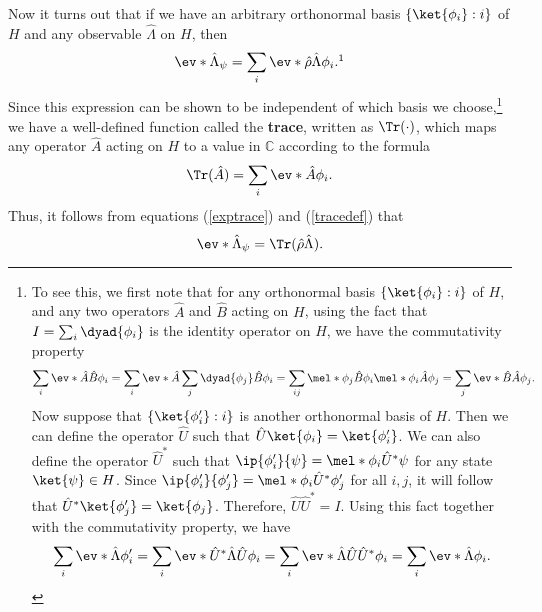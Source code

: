       Now it turns out that if we have an arbitrary orthonormal basis $\{\ket{\phi_i}:i\}$ of $H$ and any observable $\hat{\Lambda}$ on $H$, then 
    \begin{equation}\label{exptrace}\ev*{\hat{\Lambda}}_\psi=\sum_{i}\ev*{\hat{\rho}\hat{\Lambda}}{\phi_i}.\protect\footnotemark
    \end{equation}
    Since this expression can be shown to be independent of
     which basis we choose,\footnote{To see this, we first note that for any orthonormal basis $\{\ket{\phi_i}:i\}$ of $H$, and any two operators $\hat{A}$ and $\hat{B}$ acting on $H$, using the fact that $I=\sum_i\dyad{\phi_i}$ is the identity operator on $H$, we have the commutativity property $$\sum_i\ev*{\hat{A}\hat{B}}{\phi_i}=\sum_i\ev*{\hat{A}\sum_j\dyad{\phi_j}\hat{B}}{\phi_i}=\sum_{ij}\mel*{\phi_j}{\hat{B}}{\phi_i}\mel*{\phi_i}{\hat{A}}{\phi_j}=\sum_j\ev*{\hat{B}\hat{A}}{\phi_j}.$$ Now suppose that $\{\ket{\phi_i'}:i\}$  is another orthonormal basis of $H$. Then we can define the operator $\hat{U}$ such that $\hat{U}\ket{\phi_i}=\ket{\phi_i'}$. We can also define the operator $\hat{U}^*$ such that $\ip{\phi_i'}{\psi}=\mel*{\phi_i}{\hat{U}^*}{\psi}$ for any state $\ket{\psi}\in H$. Since $\ip{\phi_i'}{\phi_j'}=\mel*{\phi_i}{\hat{U}^*}{\phi_j'}$ for all $i, j$, it will follow that  $\hat{U}^*\ket{\phi_j'}=\ket{\phi_j}$. Therefore, $\hat{U}\hat{U}^*=I$. Using this fact together with the commutativity property, we have 
    $$\sum_i \ev*{\hat{\Lambda}}{\phi_i'}= \sum_i\ev*{\hat{U}^*\hat{\Lambda}\hat{U}}{\phi_i}
    =\sum_i\ev*{\hat{\Lambda}\hat{U}\hat{U}^*}{\phi_i}=\sum_i\ev*{\hat{\Lambda}}{\phi_i}.$$} 
     we have a well-defined function called the \textbf{trace}, written as $\Tr(\cdot)$, which maps any operator $\hat{A}$ acting on $H$ to a value in $\mathbb{C}$ according to the formula
    \begin{equation}\Tr (\hat{A})=\sum_i \ev*{\hat{A}}{\phi_i}.\label{tracedef}\end{equation}
    Thus, it follows from equations (\ref{exptrace}) and (\ref{tracedef}) that 
    \begin{equation}
    \ev*{\hat{\Lambda}}_\psi=\Tr (\hat{\rho}\hat{\Lambda}\label{traceev}).
    \end{equation}
